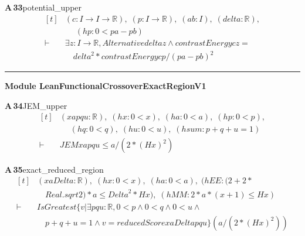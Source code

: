 \documentclass[conference]{IEEEtran}
\theoremstyle{definition}
\newcommand{\lean}[1]{\textsf{\footnotesize #1}}
\begin{document}
\noindent\textbf{A\,33}\quad\lean{potential\_upper}
{\footnotesize\[ \begin{aligned}[t]
&(\mathit{c} : \mathit{I} \to \mathit{I} \to \mathbb{R} ),\; (\mathit{p} : \mathit{I} \to \mathbb{R} ),\; (\mathit{a} \mathit{b} : \mathit{I}),\; (\mathit{delta} : \mathbb{R} ),\\
&\quad \; (\mathit{hp} : 0 < \mathit{p} \mathit{a}-\mathit{p} \mathit{b})\\
\vdash\;&\exists \mathit{z} : \mathit{I} \to \mathbb{R} , \mathit{Alternative} \mathit{delta} \mathit{z} \wedge \mathit{contrastEnergy} \mathit{c} \mathit{z} =\\
&\quad \mathit{delta}^{2}*\mathit{contrastEnergy} \mathit{c} \mathit{p}/(\mathit{p} \mathit{a}-\mathit{p} \mathit{b})^{2}
\end{aligned} \]}

\vspace{4pt}\noindent\rule{\columnwidth}{0.4pt}\par\vspace{2pt}
\noindent\textbf{Module \lean{LeanFunctionalCrossoverExactRegionV1}}\par\vspace{3pt}

\noindent\textbf{A\,34}\quad\lean{JEM\_upper}
{\footnotesize\[ \begin{aligned}[t]
&(\mathit{x} \mathit{a} \mathit{p} \mathit{q} \mathit{u} : \mathbb{R} ),\; (\mathit{hx} : 0<\mathit{x}),\; (\mathit{ha} : 0<\mathit{a}),\; (\mathit{hp} : 0<\mathit{p}),\\
&\quad \; (\mathit{hq} : 0<\mathit{q}),\; (\mathit{hu} : 0<\mathit{u}),\; (\mathit{hsum} : \mathit{p}+\mathit{q}+\mathit{u}=1)\\
\vdash\;&\mathit{JEM} \mathit{x} \mathit{a} \mathit{p} \mathit{q} \mathit{u} \leq \mathit{a}/(2*(\mathit{H} \mathit{x})^{2})
\end{aligned} \]}

\noindent\textbf{A\,35}\quad\lean{exact\_reduced\_region}
{\footnotesize\[ \begin{aligned}[t]
&(\mathit{x} \mathit{a} \mathit{Delta} : \mathbb{R} ),\; (\mathit{hx} : 0<\mathit{x}),\; (\mathit{ha} : 0<\mathit{a}),\; (\mathit{hEE} : (2+2*\\
&\quad \mathit{Real}.\mathit{sqrt} 2)*\mathit{a} \leq \mathit{Delta}^{2}*\mathit{H} \mathit{x}),\; (\mathit{hMM} : 2*\mathit{a}*(\mathit{x}+1) \leq \mathit{H} \mathit{x})\\
\vdash\;&\mathit{IsGreatest} \{ \mathit{v} | \exists \mathit{p} \mathit{q} \mathit{u} : \mathbb{R} , 0<\mathit{p} \wedge 0<\mathit{q} \wedge 0<\mathit{u} \wedge\\
&\quad \mathit{p}+\mathit{q}+\mathit{u}=1 \wedge \mathit{v}=\mathit{reducedScore} \mathit{x} \mathit{a} \mathit{Delta} \mathit{p} \mathit{q} \mathit{u}\} (\mathit{a}/(2*(\mathit{H} \mathit{x})^{2}))
\end{aligned} \]}
\end{document}
